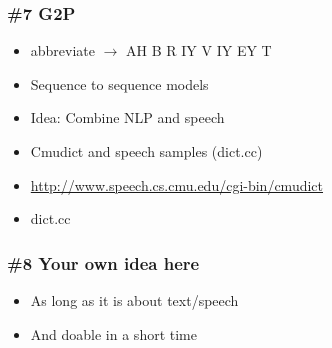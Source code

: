 \documentclass{beamer}
\begin{document}
\begin{frame}
\frametitle{\#7 G2P}
 \begin{itemize}
    \item abbreviate $\rightarrow$ AH B R IY V IY EY T
    \item Sequence to sequence models
 	\item Idea: Combine NLP and speech
 	\item Cmudict and speech samples (dict.cc)
 	\item \url{http://www.speech.cs.cmu.edu/cgi-bin/cmudict}
 	\item dict.cc
   \end{itemize}
\end{frame}

\begin{frame}
\frametitle{\#8 Your own idea here}
 \begin{itemize}
    \item As long as it is about text/speech
    \item And doable in a short time
   \end{itemize}
\end{frame}
\end{document}
